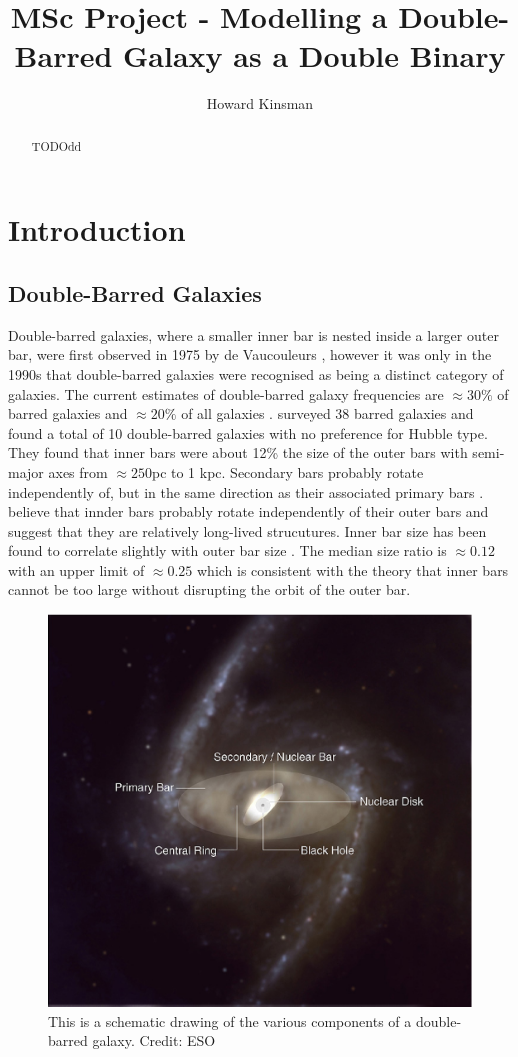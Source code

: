\documentclass[a4paper,12pt]{article}
\author{Howard Kinsman}
\title{MSc Project - Modelling a Double-Barred Galaxy as a Double Binary}
\begin{document}
\maketitle
\begin{abstract}
TODOdd
\end{abstract}
\section{Introduction}
\subsection{Double-Barred Galaxies} 
Double-barred galaxies, where a smaller inner bar is nested inside a larger outer bar, were first observed in 1975 by de Vaucouleurs \citep{vaucouleurs}, however it was only in the 1990s that double-barred galaxies
were recognised as being a distinct category of galaxies. The current estimates of double-barred galaxy frequencies are $\approx30\%$ of barred galaxies and $\approx20\%$ of all galaxies \citep{erwin3}.
\cite{erwin2} surveyed 38 barred galaxies and found a total of 10 double-barred galaxies with no preference for Hubble type. They found that inner bars were about 12\% the size of the outer bars with
semi-major axes from $\approx250$pc to 1 kpc. Secondary bars probably rotate independently of, but in the same direction as their associated primary bars \cite{erwin2}.
\cite{erwin1} believe that innder bars probably rotate independently of their outer bars and suggest that they are relatively long-lived strucutures.
Inner bar size has been found to correlate slightly with outer bar size \citep{erwin3}. The median size ratio is $\approx0.12$ with an upper limit of $\approx0.25$ which is consistent with the theory that
inner bars cannot be too large without disrupting the orbit of the outer bar.

\begin{figure}[H]
\centering
\includegraphics[width=.9\textwidth]{./eso0128d.eps}
\caption{This is a schematic drawing of the various components of a double-barred galaxy. Credit: ESO}
\label{fig:doublepic}
\end{figure}
\end{document}
